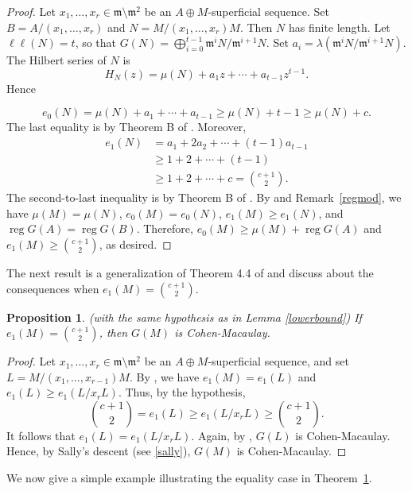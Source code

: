 \documentclass[11pt]{amsart}
\theoremstyle{plain}
\newtheorem{proposition}[theorem]{Proposition}
\theoremstyle{plain}
\begin{document}
\begin{proof}
Let $x_1,\ldots,x_r\in\mathfrak{m}\setminus\mathfrak{m}^2$ be an
$A\oplus M$-superficial sequence. Set
$B=A/(x_1,\ldots,x_r)$ and $N=M/(x_1,\ldots,x_r)M$.
Then $N$ has finite length. Let $\ell\ell(N)=t$, so that
$ G(N)=\bigoplus_{i=0}^{t-1}\mathfrak{m}^iN/\mathfrak{m}^{i+1}N$.
Set $ a_i=\lambda(\mathfrak{m}^iN/\mathfrak{m}^{i+1}N)$. The Hilbert series of $N$ is
$$H_N(z)=\mu(N)+a_1z+\cdots+a_{t-1}z^{t-1}.$$
Hence

$$e_0(N)=\mu(N)+a_1+\cdots+a_{t-1}
\geq\mu(N)+t-1
\geq\mu(N)+c.$$
The last equality is by Theorem B of \cite{nawaz}. Moreover,
\[
\begin{aligned}
e_1(N)
&=a_1+2a_2+\cdots+(t-1)a_{t-1}\\
&\geq 1+2+\cdots+(t-1)\\
&\geq 1+2+\cdots+c
=\binom{c+1}{2}.
\end{aligned}
\]
The second-to-last inequality is by Theorem B of \cite{nawaz}. By \cite[Corollary 10]{HCCMM} and Remark~\ref{regmod}, we have
$\mu(M)=\mu(N)$, $e_0(M)=e_0(N)$, $e_1(M)\geq e_1(N)$, and $\operatorname{reg} G(A)=\operatorname{reg} G(B)$. Therefore,
$e_0(M)\geq\mu(M)+\operatorname{reg} G(A)$ and
$e_1(M)\geq\binom{c+1}{2}$, as desired.
\end{proof}




The next result is a generalization of Theorem 4.4 of \cite{Quasipure} and discuss about the consequences when $e_1(M)=\binom{c+1}{2}.$
\begin{proposition}
\label{reg}
    (with the same hypothesis as in Lemma \ref{lowerbound}) If $e_1(M)=\binom{c+1}{2}$, then $G(M)$ is Cohen-Macaulay.
\end{proposition}
\begin{proof}
 Let $x_1,\ldots,x_r\in\mathfrak{m}\setminus\mathfrak{m}^2$ be an $A\oplus M$-superficial sequence, and set
$L=M/(x_1,\ldots,x_{r-1})M$. By \cite[Corollary 10]{HCCMM}, we have $e_1(M)=e_1(L)$ and $e_1(L)\geq e_1(L/x_rL)$. Thus, by the hypothesis,
$$\binom{c+1}{2}=e_1(L)\geq e_1(L/x_rL)\geq\binom{c+1}{2}.$$ It follows that $e_1(L)=e_1(L/x_rL)$. Again, by \cite[Corollary 10]{HCCMM}, $G(L)$ is Cohen-Macaulay. Hence, by Sally's descent (see \ref{sally}), $G(M)$ is Cohen-Macaulay.
\end{proof}

We now give a simple example illustrating the equality case in Theorem~\ref{reg}.
\end{document}

